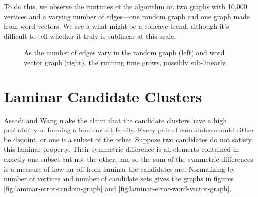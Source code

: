\documentclass[
]{article}
\begin{document}
To do this, we observe the runtimes of the algorithm on two graphs with 10,000
vertices and a varying number of edges---one random graph and one graph made
from word vectors. We see a what might be a concave trend, although it's difficult to
tell whether it truly is sublinear at this scale.

\begin{figure}[!htb]
  \caption{\label{fig:running-time-c-varies}
    As the number of edges vary in the random graph (left) and word vector graph (right),
    the running time grows, possibly sub-linearly.}
\end{figure}

\hypertarget{laminar-candidate-clusters}{%
  \section{Laminar Candidate
    Clusters}\label{laminar-candidate-clusters}}

Assadi and Wang make the claim that the candidate clusters have a high
probability of forming a laminar set family. Every pair of candidates
should either be disjoint, or one is a subset of the other. Suppose two
candidates do not satisfy this laminar property. Their symmetric
difference is all elements contained in exactly one subset but not the
other, and so the sum of the symmetric differences is a measure of how
far off from laminar the candidates are. Normalizing by number of
vertices and number of candidate sets gives the graphs in figures \ref{fig:laminar-error-random-graph} and \ref{fig:laminar-error-word-vector-graph}.
\end{document}
